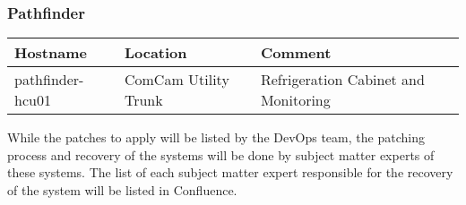 \subsubsection{Pathfinder}

\begin{tabular}{|p{5cm}|p{3cm}|p{5cm}| }
    \hline
    \rowcolor{lightgray}
    Hostname & Location & Comment \\
    \hline
    pathfinder-hcu01 & ComCam Utility Trunk & Refrigeration Cabinet and Monitoring \\
    \hline
\end{tabular}

While the patches to apply will be listed by the DevOps team, the patching process and recovery of the systems will be done by subject matter experts of these systems. The list of each subject matter expert responsible for the recovery of the system will be listed in Confluence.
